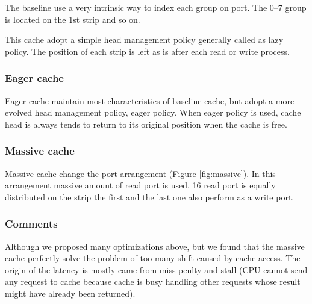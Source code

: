 \documentclass[11pt]{article}
\begin{document}
The baseline use a very intrinsic way to index each group on port. The 0--7 group is located on the 1st strip and so on.

This cache adopt a simple head management policy generally called as lazy policy. The position of each strip is left as is after each read or write process.

\subsubsection{Eager cache}

Eager cache maintain most characteristics of baseline cache, but adopt a more evolved head management policy, eager policy. When eager policy is used, cache head is always tends to return to its original position when the cache is free.

\subsubsection{Massive cache}

Massive cache change the port arrangement (Figure \ref{fig:massive}). In this arrangement massive amount of read port is used. 16 read port is equally distributed on the strip the first and the last one also perform as a write port.

\subsubsection{Comments}

Although we proposed many optimizations above, but we found that the massive cache perfectly solve the problem of too many shift caused by cache access. The origin of the latency is mostly came from miss penlty and stall (CPU cannot send any request to cache because cache is busy handling other requests whose result might have already been returned).
\end{document}

